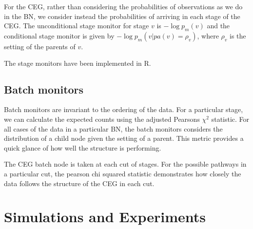 \documentclass[12pt]{article}
\begin{document}
For the CEG, rather than considering the probabilities of observations as we do in the BN, we consider instead the probabilities of arriving in each stage of the CEG. The unconditional stage monitor for stage $v$ is $-\log p_m(v)$ and the conditional stage monitor is given by $-\log p_m (v | pa(v)=\rho_v)$, where $\rho_v$ is the setting of the parents of $v$. 

The stage monitors have been implemented in R.


\subsection{Batch monitors}

Batch monitors are invariant to the ordering of the data. For a particular stage, we can calculate the expected counts using the adjusted Pearsons $\chi^2$ statistic.   
For all cases of the data in a particular BN, the batch monitors considers the distribution of a child node given the setting of a parent. This metric provides a quick glance of how well the structure is performing.

The CEG batch node is taken at each cut of stages. For the possible pathways in a particular cut, the pearson chi squared statistic demonstrates how closely the data follows the structure of the CEG in each cut. 



%
%
%

\section{Simulations and Experiments}
\end{document}
